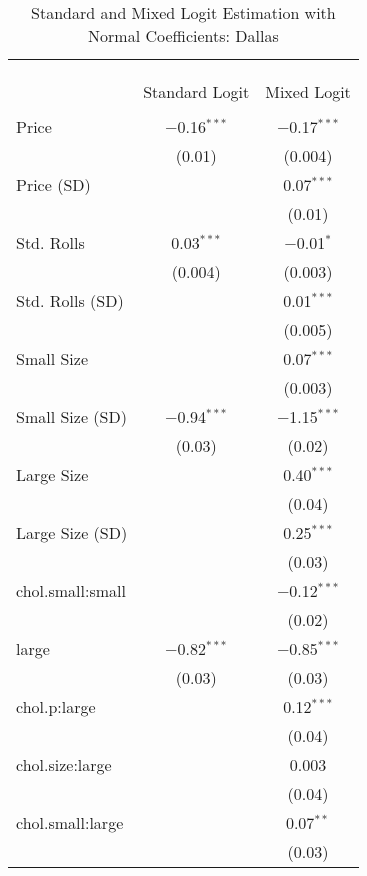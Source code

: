 
\begin{table}[!htbp] \centering 
  \caption{Standard and Mixed Logit Estimation with Normal Coefficients: Dallas} 
  \label{tab:mnlDallasBaseline} 
\begin{tabular}{@{\extracolsep{5pt}}lcc} 
\\[-1.8ex]\hline 
\hline \\[-1.8ex] 
\\[-1.8ex] & \multicolumn{2}{c}{} \\ 
 & Standard Logit & Mixed Logit \\ 
\hline \\[-1.8ex] 
 Price & $-$0.16$^{***}$ & $-$0.17$^{***}$ \\ 
  & (0.01) & (0.004) \\ 
  Price (SD) &  & 0.07$^{***}$ \\ 
  &  & (0.01) \\ 
  Std. Rolls & 0.03$^{***}$ & $-$0.01$^{*}$ \\ 
  & (0.004) & (0.003) \\ 
  Std. Rolls (SD) &  & 0.01$^{***}$ \\ 
  &  & (0.005) \\ 
  Small Size &  & 0.07$^{***}$ \\ 
  &  & (0.003) \\ 
  Small Size (SD) & $-$0.94$^{***}$ & $-$1.15$^{***}$ \\ 
  & (0.03) & (0.02) \\ 
  Large Size &  & 0.40$^{***}$ \\ 
  &  & (0.04) \\ 
  Large Size (SD) &  & 0.25$^{***}$ \\ 
  &  & (0.03) \\ 
  chol.small:small &  & $-$0.12$^{***}$ \\ 
  &  & (0.02) \\ 
  large & $-$0.82$^{***}$ & $-$0.85$^{***}$ \\ 
  & (0.03) & (0.03) \\ 
  chol.p:large &  & 0.12$^{***}$ \\ 
  &  & (0.04) \\ 
  chol.size:large &  & 0.003 \\ 
  &  & (0.04) \\ 
  chol.small:large &  & 0.07$^{**}$ \\ 
  &  & (0.03) \\ 

\end{tabular}
\end{table}
